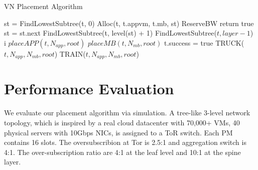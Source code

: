 \documentclass[10pt, conference, letterpaper]{IEEEtran}
\begin{document}
\begin{algorithm}[!htbp]
\caption{VN Placement Algorithm}
\label{alg1}
	\begin{algorithmic}[1]
		\State st = FindLowestSubtree(t, 0)
			\State	Alloc(t, t.appvm, t.mb, st)
				\State	ReserveBW
				\State  return true
			\EndIf
		\State st = st.next
			\State FindLowestSubtree(t, level(st) + 1)
		\EndIf
		\EndWhile
		\State{}
	\EndFunction
	\State
						\State\Return FindLowestSubtree($t, layer-1$)
					\EndIf
				\EndFor
				\State\Return i
			\EndIf
		\EndFor
		\State{}
	\EndFunction
	\State
			\State $placeAPP(t, N_{app}, root)$
			\State $placeMB(t, N_{mb}, root)$
				\State t.success = true
			\EndIf
		\Else
				\State TRUCK($t, N_{app}, N_{mb}, root$)
			\Else
				\State TRAIN($t, N_{app}, N_{mb}, root$)			
			\EndIf
		\EndIf
	\EndFunction
	\end{algorithmic}
\end{algorithm}





\section{Performance Evaluation}\label{sec:simulation}
We evaluate our placement algorithm via simulation. A tree-like 3-level network topology, which is inspired by a real cloud datacenter with 70,000+ VMs, 40 physical servers with 10Gbps NICs, is assigned to a ToR switch. Each PM contains 16 slots. The oversubscribion at Tor is 2.5:1 and aggregation switch is 4:1. The over-subscription ratio are 4:1 at the leaf level and 10:1 at the spine layer.
\end{document}
